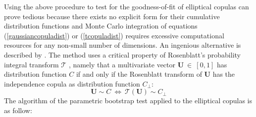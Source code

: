 Using the above procedure to test for the goodness-of-fit of elliptical
copulas can prove tedious because
there exists no explicit form for their cumulative distribution functions and Monte
Carlo integration of equations (\ref{gaussiancopuladist}) or (\ref{tcopuladist})
requires excessive computational resources for any
non-small number of dimensions. An ingenious alternative is described by
\cite{genestetal09}. The method uses a critical property of Rosenblatt's probability
integral transform $\mathcal{T}$  \citep{rosenblatt52}, namely that a
multivariate vector $\mathbf{U} \ \in \ [0,1]$ has distribution function $C$
if and only if the Rosenblatt transform of $\mathbf{U}$ has the independence
copula as distribution function $C_\perp$:
\begin{displaymath}
\mathbf{U} \sim C \ \Leftrightarrow \ \mathcal{T}(\mathbf{U}) \sim C_{\perp}
\end{displaymath}
The algorithm of the parametric bootstrap test applied to the elliptical copulas is as follow:
